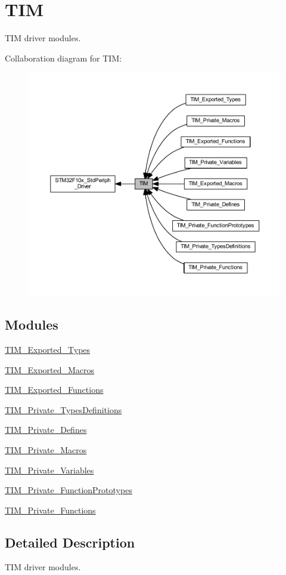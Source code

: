 \hypertarget{group___t_i_m}{}\section{T\+IM}
\label{group___t_i_m}


T\+IM driver modules.  


Collaboration diagram for T\+IM\+:
\nopagebreak
\begin{figure}[H]
\begin{center}
\leavevmode
\includegraphics[width=350pt]{group___t_i_m}
\end{center}
\end{figure}
\subsection*{Modules}
\begin{DoxyCompactItemize}
\item 
\hyperlink{group___t_i_m___exported___types}{T\+I\+M\+\_\+\+Exported\+\_\+\+Types}
\item 
\hyperlink{group___t_i_m___exported___macros}{T\+I\+M\+\_\+\+Exported\+\_\+\+Macros}
\item 
\hyperlink{group___t_i_m___exported___functions}{T\+I\+M\+\_\+\+Exported\+\_\+\+Functions}
\item 
\hyperlink{group___t_i_m___private___types_definitions}{T\+I\+M\+\_\+\+Private\+\_\+\+Types\+Definitions}
\item 
\hyperlink{group___t_i_m___private___defines}{T\+I\+M\+\_\+\+Private\+\_\+\+Defines}
\item 
\hyperlink{group___t_i_m___private___macros}{T\+I\+M\+\_\+\+Private\+\_\+\+Macros}
\item 
\hyperlink{group___t_i_m___private___variables}{T\+I\+M\+\_\+\+Private\+\_\+\+Variables}
\item 
\hyperlink{group___t_i_m___private___function_prototypes}{T\+I\+M\+\_\+\+Private\+\_\+\+Function\+Prototypes}
\item 
\hyperlink{group___t_i_m___private___functions}{T\+I\+M\+\_\+\+Private\+\_\+\+Functions}
\end{DoxyCompactItemize}


\subsection{Detailed Description}
T\+IM driver modules. 

